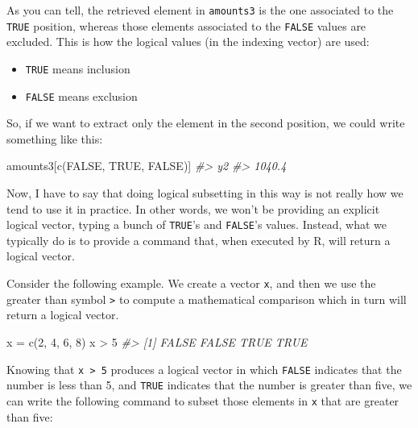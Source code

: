 \documentclass[
]{book}
\newenvironment{Shaded}{\begin{snugshade}}{\end{snugshade}}
\newcommand{\CommentTok}[1]{\textcolor[rgb]{0.56,0.35,0.01}{\textit{#1}}}
\newcommand{\ConstantTok}[1]{\textcolor[rgb]{0.00,0.00,0.00}{#1}}
\newcommand{\DecValTok}[1]{\textcolor[rgb]{0.00,0.00,0.81}{#1}}
\newcommand{\FunctionTok}[1]{\textcolor[rgb]{0.00,0.00,0.00}{#1}}
\newcommand{\NormalTok}[1]{#1}
\newcommand{\OtherTok}[1]{\textcolor[rgb]{0.56,0.35,0.01}{#1}}
\newcommand{\SpecialCharTok}[1]{\textcolor[rgb]{0.00,0.00,0.00}{#1}}
\providecommand{\tightlist}{%
  \setlength{\itemsep}{0pt}\setlength{\parskip}{0pt}}
\begin{document}
As you can tell, the retrieved element in \texttt{amounts3} is the one associated to
the \texttt{TRUE} position, whereas those elements associated to the \texttt{FALSE} values
are excluded. This is how the logical values (in the indexing vector) are used:

\begin{itemize}
\tightlist
\item
  \texttt{TRUE} means inclusion
\item
  \texttt{FALSE} means exclusion
\end{itemize}

So, if we want to extract only the element in the second position, we could
write something like this:

\begin{Shaded}
\begin{Highlighting}[]
\NormalTok{amounts3[}\FunctionTok{c}\NormalTok{(}\ConstantTok{FALSE}\NormalTok{, }\ConstantTok{TRUE}\NormalTok{, }\ConstantTok{FALSE}\NormalTok{)]}
\CommentTok{\#\textgreater{}     y2 }
\CommentTok{\#\textgreater{} 1040.4}
\end{Highlighting}
\end{Shaded}

Now, I have to say that doing logical subsetting in this way is not really
how we tend to use it in practice. In other words, we won't be providing an
explicit logical vector, typing a bunch of \texttt{TRUE}'s and \texttt{FALSE}'s values.
Instead, what we typically do is to provide a command that, when executed by R,
will return a logical vector.

Consider the following example. We create a vector \texttt{x}, and then we use the
greater than symbol \texttt{\textgreater{}} to compute a mathematical comparison which in turn
will return a logical vector.

\begin{Shaded}
\begin{Highlighting}[]
\NormalTok{x }\OtherTok{=} \FunctionTok{c}\NormalTok{(}\DecValTok{2}\NormalTok{, }\DecValTok{4}\NormalTok{, }\DecValTok{6}\NormalTok{, }\DecValTok{8}\NormalTok{)}
\NormalTok{x }\SpecialCharTok{\textgreater{}} \DecValTok{5}
\CommentTok{\#\textgreater{} [1] FALSE FALSE  TRUE  TRUE}
\end{Highlighting}
\end{Shaded}

Knowing that \texttt{x\ \textgreater{}\ 5} produces a logical vector in which \texttt{FALSE} indicates that
the number is less than 5, and \texttt{TRUE} indicates that the number
is greater than five, we can write the following command to subset those
elements in \texttt{x} that are greater than five:
\end{document}
